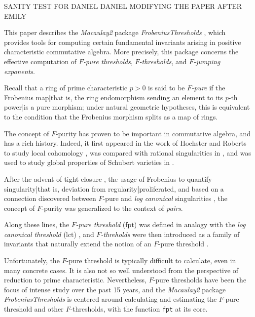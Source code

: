 \documentclass{amsart}
\begin{document}
SANITY TEST FOR DANIEL
DANIEL MODIFYING THE PAPER AFTER EMILY

This paper describes the \emph{Macaulay2} \cite{M2} package \emph{FrobeniusThresholds} \cite{FThresholdsPackage}, which provides tools for computing certain fundamental invariants arising in positive characteristic commutative algebra.  More precisely, this package concerns the effective computation of \emph{$F$-pure thresholds}, \emph{$F$-thresholds}, and \emph{$F$-jumping exponents}.

Recall that a ring of prime characteristic $p>0$ is said to be \emph{$F$-pure} if the Frobenius map|that is, the ring endomorphism sending an element to its $p$-th power|is a pure morphism;  under natural geometric hypotheses, this is equivalent to the condition that the Frobenius morphism splits as a map of rings.

The concept of $F$-purity has proven to be important in commutative algebra, and has a rich history.  Indeed, it first appeared in the work \cite{HochsterRobertsFrobeniusLocalCohomology}  of Hochster and Roberts to study local cohomology \cite{HochsterRobertsFrobeniusLocalCohomology}, was compared with rational singularities in  \cite{FedderFPureRat}, and was used to study global properties of Schubert varieties in \cite{MehtaRamanathanFrobeniusSplittingAndCohomologyVanishing}.

After the advent of tight closure \cite{HochsterHunekeTC1}, the usage of Frobenius to quantify singularity|that is, deviation from regularity|proliferated, and based on a connection discovered between $F$-pure and \emph{log canonical} singularities \cite{HaraWatanabeFRegFPure}, the concept of $F$-purity was generalized to the context of \emph{pairs}.

Along these lines, the \emph{$F$-pure threshold} (fpt)%
was defined in analogy with the \emph{log canonical threshold} (lct) \cite{TakagiWatanabeFPureThresh}, and
\emph{$F$-threholds} were then introduced as a family of invariants that naturally extend the notion of an $F$-pure threshold \cite{MustataTakagiWatanabeFThresholdsAndBernsteinSato}.

Unfortunately, the $F$-pure threshold is typically difficult to calculate, even in many concrete cases.   It is also not so well understood from the perspective of reduction to prime characteristic.   Nevertheless, $F$-pure thresholds have been the focus of intense study over the past 15 years, and the \emph{Macaulay2} package \emph{FrobeniusThresholds} is centered around calculating and estimating the $F$-pure threshold and other $F$-thresholds, with the function {\tt fpt} at its core.
\end{document}
